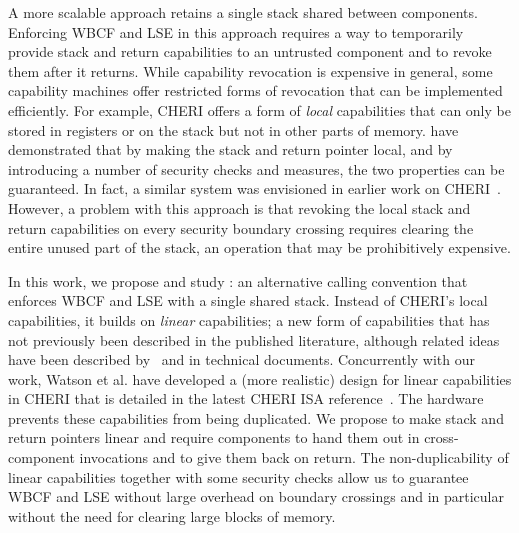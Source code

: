\documentclass[acmsmall,screen]{acmart}\settopmatter{}
\begin{document}
A more scalable approach retains a single stack shared between components.
Enforcing WBCF and LSE in this approach requires a way to temporarily provide stack and return capabilities to an untrusted component and to revoke them after it returns.
While capability revocation is expensive in general, some capability machines offer restricted forms of revocation that can be implemented efficiently.
For example, CHERI offers a form of {\itshape local} capabilities that can only be stored in registers or on the stack but not in other parts of memory.
\citet{skorstengaard_reasoning_2017} have demonstrated that by making the stack and return pointer local, and by introducing a number of security checks and measures, the two properties can be guaranteed.
In fact, a similar system was envisioned in earlier work on CHERI~\citep{watson2012cheri}. 
However, a problem with this approach is that revoking the local stack and return capabilities on every security boundary crossing requires clearing the entire unused part of the stack, an operation that may be prohibitively expensive.

In this work, we propose and study \stktokens{}: an alternative calling convention that enforces WBCF and LSE with a single shared stack.
Instead of CHERI's local capabilities, it builds on {\itshape linear} capabilities; a new form of capabilities that has not previously been described in the published literature, although related ideas have been described by~\citet[``scarce objects'']{szabo_formalizing_1997,szabo_scarce_objects} and in technical documents.
Concurrently with our work, Watson et al. have developed a (more realistic) design for linear capabilities in CHERI that is detailed in the latest CHERI ISA reference~\citep{watson2018ISA}.
The hardware prevents these capabilities from being duplicated.
We propose to make stack and return pointers linear and require components to hand them out in cross-component invocations and to give them back on return.
The non-duplicability of linear capabilities together with some security checks allow us to guarantee WBCF and LSE without large overhead on boundary crossings and in particular without the need for clearing large blocks of memory.
\end{document}
